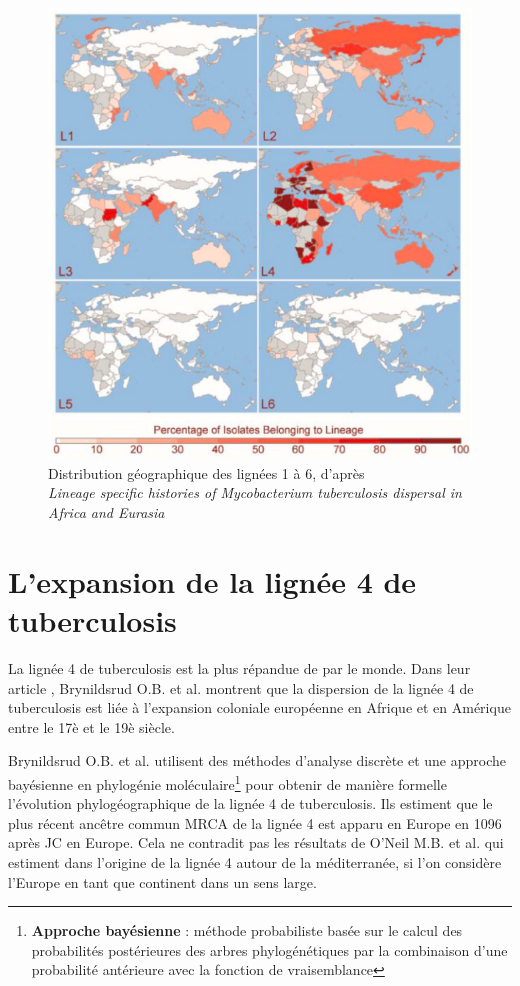 \documentclass[twoside,a4paper,11pt,frenchb,openany]{report}
\begin{document}
\begin{figure}
\includegraphics[scale=0.5]{world.png}
\caption{Distribution géographique des lignées 1 à 6, d'après\\ \textit{Lineage specific histories of Mycobacterium tuberculosis dispersal in Africa and Eurasia}}
\end{figure}


\section{L'expansion de la lignée 4 de tuberculosis}


La lignée 4 de tuberculosis est la plus répandue de par le monde. Dans leur article \cite{brynildsrud}, Brynildsrud O.B. et al. montrent que la dispersion de la lignée 4 de tuberculosis est liée à l'expansion coloniale européenne en Afrique et en Amérique entre le 17è et le 19è siècle.


Brynildsrud O.B. et al. utilisent des méthodes d'analyse discrète et une approche bayésienne en phylogénie moléculaire\footnote{\textbf{Approche bayésienne} : méthode probabiliste basée sur le calcul des probabilités postérieures des arbres phylogénétiques par la combinaison d'une probabilité antérieure avec la fonction de vraisemblance} pour obtenir de manière formelle l'évolution phylogéographique de la lignée 4 de tuberculosis. Ils estiment que le plus récent ancêtre commun MRCA de la lignée 4 est apparu en Europe en 1096 après JC en Europe. Cela ne contradit pas les résultats de O'Neil M.B. et al. qui estiment dans \cite{oneil} l'origine de la lignée 4 autour de la méditerranée, si l'on considère l'Europe en tant que continent dans un sens large.
\end{document}

